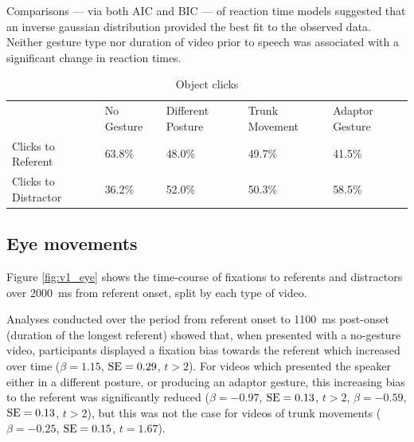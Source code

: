 \documentclass[a4paper,man,natbib]{apa6}
\newcommand{\resultsLM}[3]{$\beta = #1$, $\textnormal{SE} = #2$, $t #3$}
\begin{document}
Comparisons --- via both AIC and BIC --- of reaction time models suggested that an inverse gaussian distribution provided the best fit to the observed data.
Neither gesture type nor duration of video prior to speech was associated with a significant change in reaction times.

\begin{table}
\caption{Object clicks}
\label{table:v1_clicks}
\begin{tabularx}{\linewidth}{YYYYY}
\hline
& No Gesture & Different Posture & Trunk Movement & Adaptor Gesture \\
Clicks to Referent & 63.8\% & 48.0\% & 49.7\% & 41.5\%  \\ 
Clicks to Distractor & 36.2\% & 52.0\% & 50.3\% & 58.5\% \\
\hline
\end{tabularx}
\end{table}

\subsection{Eye movements}
Figure \ref{fig:v1_eye} shows the time-course of fixations to referents and distractors over 2000~ms from referent onset, split by each type of video.

Analyses conducted over the period from referent onset to 1100~ms post-onset (duration of the longest referent) showed that, when presented with a no-gesture video, participants displayed a fixation bias towards the referent which increased over time (\resultsLM{1.15}{0.29}{>2}).
For videos which presented the speaker either in a different posture, or producing an adaptor gesture, this increasing bias to the referent was significantly reduced
(\resultsLM{-0.97}{0.13}{>2}, \resultsLM{-0.59}{0.13}{>2}), but this was not the case for videos of trunk movements (\resultsLM{-0.25}{0.15}{=1.67}). 
\end{document}
